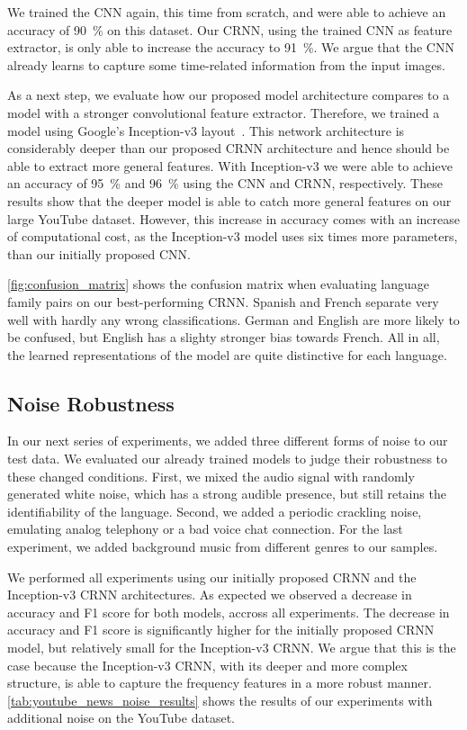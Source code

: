 \documentclass{llncs}
\begin{document}
We trained the \ac{CNN} again, this time from scratch, and were able to achieve an accuracy of \SI{90}{\percent} on this dataset.
Our \ac{CRNN}, using the trained \ac{CNN} as feature extractor, is only able to increase the accuracy to \SI{91}{\percent}.
We argue that the \ac{CNN} already learns to capture some time-related information from the input images.

As a next step, we evaluate how our proposed model architecture compares to a model with a stronger convolutional feature extractor.
Therefore, we trained a model using Google's Inception-v3 layout~\cite{Szegedy2016Rethinking}.
This network architecture is considerably deeper than our proposed \ac{CRNN} architecture and hence should be able to extract more general features.
With Inception-v3 we were able to achieve an accuracy of \SI{95}{\percent} and \SI{96}{\percent} using the \ac{CNN} and \ac{CRNN}, respectively.
These results show that the deeper model is able to catch more general features on our large YouTube dataset. However, this increase in accuracy comes with an increase of computational cost, as the Inception-v3 model uses six times more parameters, than our initially proposed \ac{CNN}.

\autoref{fig:confusion_matrix} shows the confusion matrix when evaluating language family pairs on our best-performing \ac{CRNN}.
Spanish and French separate very well with hardly any wrong classifications.
German and English are more likely to be confused, but English has a slighty stronger bias towards French.
All in all, the learned representations of the model are quite distinctive for each language.

\subsection{Noise Robustness}

In our next series of experiments, we added three different forms of noise to our test data.
We evaluated our already trained models to judge their robustness to these changed conditions.
First, we mixed the audio signal with randomly generated white noise, which has a strong audible presence, but still retains the identifiability of the language.
Second, we added a periodic crackling noise, emulating analog telephony or a bad voice chat connection.
For the last experiment, we added background music from different genres to our samples.

We performed all experiments using our initially proposed \ac{CRNN} and the Inception-v3 \ac{CRNN} architectures.
As expected we observed a decrease in accuracy and F1 score for both models, accross all experiments.
The decrease in accuracy and F1 score is significantly higher for the initially proposed \ac{CRNN} model, but relatively small for the Inception-v3 \ac{CRNN}.
We argue that this is the case because the Inception-v3 \ac{CRNN}, with its deeper and more complex structure, is able to capture the frequency features in a more robust manner.
\autoref{tab:youtube_news_noise_results} shows the results of our experiments with additional noise on the YouTube dataset.
\end{document}
